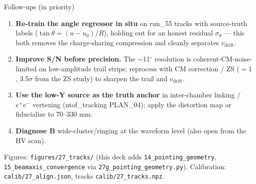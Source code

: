 \documentclass[aspectratio=169,10pt]{beamer}
\begin{document}
\begin{frame}{Follow-ups (in priority)}
\begin{enumerate}
\item \textbf{Re-train the angle regressor in situ} on run\_55 tracks with
      source-truth labels ($\tan\theta=(u-u_0)/R$), holding out for an honest
      residual $\sigma_\theta$ --- this both removes the charge-sharing
      compression and cleanly separates $v_\mathrm{drift}$.
\item \textbf{Improve S/N before precision.} The $\sim$11$^\circ$ resolution is
      coherent-CM-noise-limited on low-amplitude trail strips; reprocess with
      CM correction / ZS ($=1$, 3.5$\sigma$ from the ZS study) to sharpen the
      trail and $v_\mathrm{drift}$.
\item \textbf{Use the low-Y source as the truth anchor} in inter-chamber linking
      / $e^+e^-$ vertexing (ntof\_tracking PLAN\_04); apply the distortion map or
      fiducialize to 70--330 mm.
\item \textbf{Diagnose B} wide-cluster/ringing at the waveform level (also open
      from the HV scan).
\end{enumerate}
\vspace{1ex}
\footnotesize Figures: \texttt{figures/27\_tracks/} (this deck adds
\texttt{14\_pointing\_geometry}, \texttt{15\_beamaxis\_convergence} via
\texttt{27g\_pointing\_geometry.py}). Calibration:
\texttt{calib/27\_align.json}, tracks \texttt{calib/27\_tracks.npz}.
\end{frame}
\end{document}
